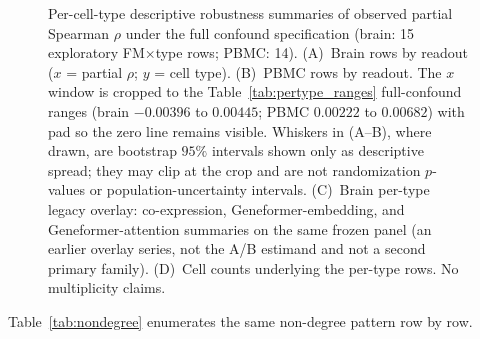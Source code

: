 \documentclass[fleqn,10pt,lineno]{wlpeerj}
\newcommand{\fitfig}[1]{\resizebox{\ifdim\width>\linewidth\linewidth\else\width\fi}{!}{#1}}
\begin{document}
\begin{figure}[!tbp]\centering
\fitfig{}
\caption{Per-cell-type descriptive robustness summaries of observed partial Spearman $\rho$ under
the full confound specification (brain: 15 exploratory FM$\times$type rows; PBMC: 14). (A)~Brain
rows by readout ($x$ = partial $\rho$; $y$ = cell type). (B)~PBMC rows by readout. The $x$ window
is cropped to the Table~\ref{tab:pertype_ranges} full-confound ranges (brain $-0.00396$ to $0.00445$;
PBMC $0.00222$ to $0.00682$) with pad so the zero line remains visible. Whiskers in
(A--B), where drawn, are bootstrap $95\%$ intervals shown only as descriptive spread; they may clip
at the crop and are not randomization $p$-values or population-uncertainty intervals. (C)~Brain
per-type legacy overlay: co-expression, Geneformer-embedding, and Geneformer-attention summaries on
the same frozen panel (an earlier overlay series, not the A/B estimand and not a second primary
family). (D)~Cell counts underlying the per-type rows. No
multiplicity claims.}\label{fig:pertype}
\end{figure}

\begin{table}[H]\centering
\fitfig{}
\caption{Per-cell-type descriptive ranges of observed partial $\rho$ under full and non-degree
confound specifications (brain: 15 exploratory FM$\times$type rows; PBMC: 14). Min/max/median
across those rows only; no randomization $p$-values, BH correction, or population-uncertainty
interpretation.}\label{tab:pertype_ranges}
\end{table}
\FloatBarrier
Table~\ref{tab:nondegree} enumerates the same non-degree pattern row by row.

\begin{table}[H]\centering
\fitfig{}
\caption{Non-degree dual-null pattern for all 13 FM rows. The prespecified non-degree sensitivity
is the full design minus the two proxy-derived degree covariates. $M$ is the gene-label
permutation null and $D$ is the within-TF-row degree-preserving target shuffle ($N=999$ each);
each $q$ is BH-adjusted within the non-degree families. Dual-null Support ($q_M<0.05$ and
$q_D<0.05$) is $0/13$. Pattern ``D-only'' is $q_D<0.05$ with $q_M\ge0.05$; ``neither'' is both
$q\ge0.05$. Dual non-deg is reported in the protocol-pass matrix but is not required for
protocol-pass.}\label{tab:nondegree}
\end{table}
\end{document}
